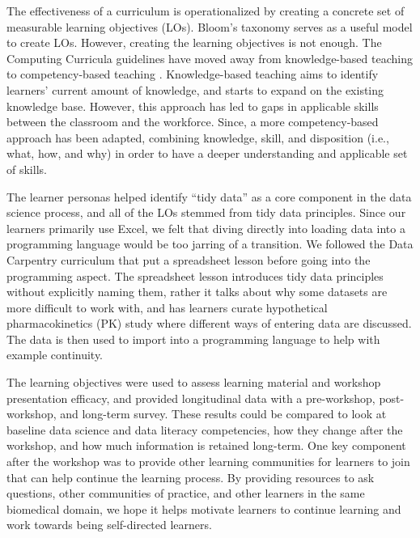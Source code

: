 \documentclass[030-workshop.tex]{subfiles}
\begin{document}
    The effectiveness of a curriculum is operationalized by creating a concrete set of
    measurable learning objectives (LOs).
    Bloom's taxonomy serves as a useful model to create LOs.
    However, creating the learning objectives is not enough.
    The Computing Curricula guidelines have moved away from knowledge-based teaching to competency-based teaching
    \cite{cc2005, cc2020, ccdsc2021}.
    Knowledge-based teaching aims to identify learners' current amount of knowledge,
    and starts to expand on the existing knowledge base.
    However, this approach has led to gaps in applicable skills between the classroom and the workforce.
    Since, a more competency-based approach has been adapted,
    combining knowledge, skill, and disposition (i.e., what, how, and why) in order
    to have a deeper understanding and applicable set of skills.

    The learner personas helped identify ``tidy data'' as a core component in the data science process,
    and all of the LOs stemmed from tidy data principles.
    Since our learners primarily use Excel,
    we felt that diving directly into loading data into a programming language would be too jarring of a transition.
    We followed the Data Carpentry curriculum that put a spreadsheet lesson before going into the programming aspect.
    The spreadsheet lesson introduces tidy data principles without explicitly naming them,
    rather it talks about why some datasets are more difficult to work with,
    and has learners curate hypothetical pharmacokinetics (PK) study where different ways of entering data are discussed.
    The data is then used to import into a programming language to help with example continuity.

    The learning objectives were used to assess learning material and workshop presentation efficacy,
    and provided longitudinal data with a pre-workshop, post-workshop, and long-term survey.
    These results could be compared to look at baseline data science and data literacy competencies,
    how they change after the workshop,
    and how much information is retained long-term.
    One key component after the workshop was to provide other learning communities for learners to join
    that can help continue the learning process.
    By providing resources to ask questions, other communities of practice,
    and other learners in the same biomedical domain,
    we hope it helps motivate learners to continue learning and work towards being self-directed learners.
\end{document}

